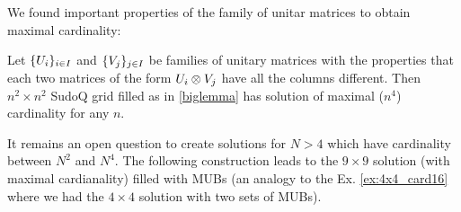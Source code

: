 \documentclass[11pt]{article}
\begin{document}
We found important properties of the family of unitar matrices to obtain  maximal cardinality: 
\begin{theorem}
    Let $\{\mathnormal{U}_i\}_{i\in I}$ and  $\{\mathnormal{V}_j\}_{j\in I}$ be families of unitary matrices with the properties that each two matrices of the form  $\mathnormal{U}_i\otimes\mathnormal{V}_j$ have all the columns different. Then $n^2\times n^2$ SudoQ grid filled as in \ref{biglemma} has solution of maximal ($n^4$) cardinality for any $n$. 
\end{theorem}

It remains an open question to create solutions for $N>4$ which have cardinality between $N^{2}$ and $N^{4}$. The following construction leads to the $9\times 9$ solution (with maximal cardianality) filled with MUBs (an analogy to the Ex. \ref{ex:4x4_card16} where we had the $4\times 4$ solution with two sets of MUBs).
\end{document}

